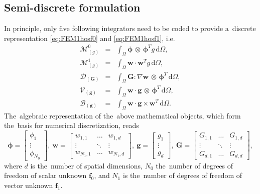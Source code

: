\documentclass[review]{elsarticle}
\newcommand{\vect}[1]{\boldsymbol{#1}}
\newcommand{\matr}[1]{\mathbf{#1}}
\newcommand{\dI}{\text{d}}
\newcommand{\vfzero}{\vect{f}_0}
\newcommand{\fone}{\vect{f}_1}
\newcommand{\intO}{\int_{\Omega}}
\newcommand{\IM}{\boldsymbol{\mathcal{M}}}
\newcommand{\ID}{\boldsymbol{\mathcal{D}}}
\newcommand{\IV}{\boldsymbol{\mathcal{V}}}
\newcommand{\IB}{\boldsymbol{\mathcal{B}}}
\begin{document}
\subsection{Semi-discrete formulation}\label{sec:semidiscrete_form}

In principle, only five following integrators need to be coded to provide
a~discrete representation \eqref{eq:FEM1hosf0} and \eqref{eq:FEM1hosf1}, i.e.
\begin{eqnarray}
  \IM^0_{(g)} &=& \intO\vect{\phi}\, \otimes\, \vect{\phi}^T g\, \dI \Omega ,
  \label{eq:IM0}\\
  \IM^1_{(g)} &=& \intO\matr{w} \cdot \matr{w}^T g\, \dI\Omega ,
  \label{eq:IM1}\\
  \ID_{(\matr{G})} &=& \intO \matr{G} : \nabla\matr{w}
  \, \otimes\, \vect{\phi}^T\, \dI \Omega ,
  \label{eq:ID}\\
  \IV_{(\vect{g})} &=& \intO\matr{w} \cdot
  \vect{g}\, \otimes\, \vect{\phi}^T\, \dI \Omega ,
  \label{eq:IV}\\
  \IB_{(\vect{g})} &=& \intO\matr{w} \cdot
  \vect{g} \times \matr{w}^T\, \dI \Omega .
  \label{eq:IB}
\end{eqnarray}
The~algebraic representation of the~above mathematical objects, which
form the~basis for numerical discretization, reads 
\begin{equation}
  \vect{\phi} = \begin{bmatrix}
    \phi_{1} \\
	\vdots   \\
	\phi_{N_0}
  \end{bmatrix},~
  \matr{w} = \begin{bmatrix}
    w_{1, 1} & \hdots & w_{1, d} \\
	\vdots   & \ddots & \vdots \\
	w_{N_1, 1} & \hdots & w_{N_1, d}
  \end{bmatrix},~
  \vect{g} = \begin{bmatrix}
    g_{1} \\
	\vdots   \\
	g_{d}
  \end{bmatrix},~
  \matr{G} = \begin{bmatrix}
    G_{1, 1} & \hdots & G_{1, d} \\
	\vdots   & \ddots & \vdots \\
	G_{d, 1} & \hdots & G_{d, d}
  \end{bmatrix},
\end{equation}
where $d$ is the~number of spatial dimensions, $N_0$ the~number of
degrees of freedom of scalar unknown $\vfzero$, and $N_1$ is the~number
of degrees of freedom of vector unknown $\fone$.
\end{document}
